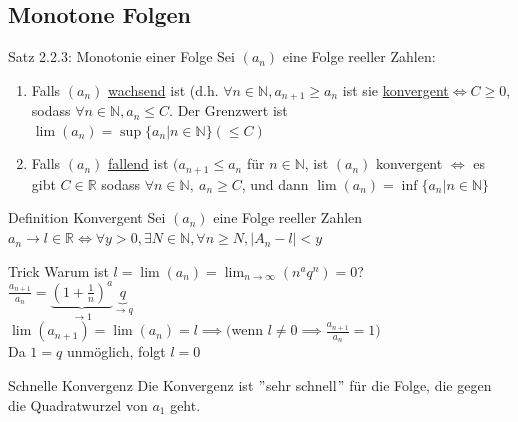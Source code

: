 \documentclass[a4paper,10pt]{article}
\begin{document}
\subsection{Monotone Folgen}
\begin{tbox}{Satz 2.2.3: Monotonie einer Folge}
    Sei $(a_n)$ eine Folge reeller Zahlen:
    \begin{enumerate}
        \item Falls $(a_n)$ \underline{wachsend} ist (d.h. $\forall n\in \mathbb N, a_{n+1}\ge a_n$ ist sie \underline{konvergent}$\iff C\ge 0 $, sodass $\forall n \in \mathbb N, a_n \le C$.
        Der Grenzwert ist $\lim(a_n) = \sup\{a_n|n\in\mathbb N \} (\le C)$
        \item Falls $(a_n)$ \underline{fallend} ist $(a_{n+1}\le a_n $ für $n\in \mathbb N $, ist $(a_n)$ konvergent $\iff$ es gibt $C\in \mathbb R$ sodass $\forall n \in \mathbb N,\ a_n\ge C$, und dann $ \lim(a_n)=\inf\{a_n|n\in \mathbb N\}$
    \end{enumerate}
\end{tbox}

\begin{defbox} {Definition Konvergent}
Sei $(a_n)$ eine Folge reeller Zahlen $a_n\longrightarrow l  \in \mathbb R \iff \forall y > 0, \exists N \in \mathbb N, \forall n \ge N, |A_n-l|<y$
\end{defbox}
\begin{tipbox}{Trick}
    Warum ist $l=\lim(a_n)=\lim_{n\to\infty}(n^a q^n)=0$?\\
    $\frac{a_{n+1}}{a_n}=\underbrace{(1+\frac{1}{n})^a}_{\to 1} \underbrace{q}_{\to q}$
    \\ $\lim(a_{n+1})=\lim(a_n)=l \implies ($wenn $ l\neq 0 \implies \frac{a_{n+1}}{a_n}=1) $
    \\ Da $1=q $ unmöglich, folgt $l=0$
\end{tipbox}
\begin{bembox}{Schnelle Konvergenz}
    Die Konvergenz ist $"$sehr schnell$"$ für die Folge, die gegen die Quadratwurzel von $a_1$ geht.
\end{bembox}
\end{document}
